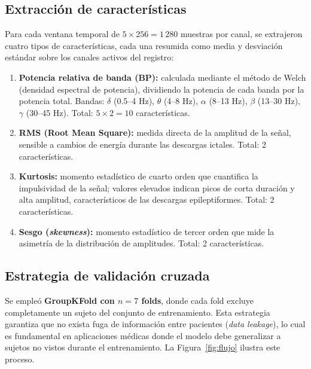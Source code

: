 \documentclass[12pt,a4paper]{article}
\begin{document}
\subsection{Extracción de características}

Para cada ventana temporal de $5 \times 256 = 1\,280$ muestras por canal, se extrajeron
cuatro tipos de características, cada una resumida como media y desviación estándar
sobre los canales activos del registro:

\begin{enumerate}
\item \textbf{Potencia relativa de banda (BP):} calculada mediante el método de Welch
  (densidad espectral de potencia), dividiendo la potencia de cada banda por la potencia
  total. Bandas: $\delta$ (0.5--4 Hz), $\theta$ (4--8 Hz), $\alpha$ (8--13 Hz),
  $\beta$ (13--30 Hz), $\gamma$ (30--45 Hz). Total: $5 \times 2 = 10$ características.

\item \textbf{RMS (Root Mean Square):} medida directa de la amplitud de la señal,
  sensible a cambios de energía durante las descargas ictales. Total: 2 características.

\item \textbf{Kurtosis:} momento estadístico de cuarto orden que cuantifica la
  impulsividad de la señal; valores elevados indican picos de corta duración y alta
  amplitud, característicos de las descargas epileptiformes. Total: 2 características.

\item \textbf{Sesgo (\textit{skewness}):} momento estadístico de tercer orden que mide
  la asimetría de la distribución de amplitudes. Total: 2 características.
\end{enumerate}

\subsection{Estrategia de validación cruzada}

Se empleó \textbf{GroupKFold con $n=7$ folds}, donde cada fold excluye completamente
un sujeto del conjunto de entrenamiento. Esta estrategia garantiza que no exista fuga
de información entre pacientes (\textit{data leakage}), lo cual es fundamental en
aplicaciones médicas donde el modelo debe generalizar a sujetos no vistos durante el
entrenamiento. La Figura~\ref{fig:flujo} ilustra este proceso.
\end{document}
